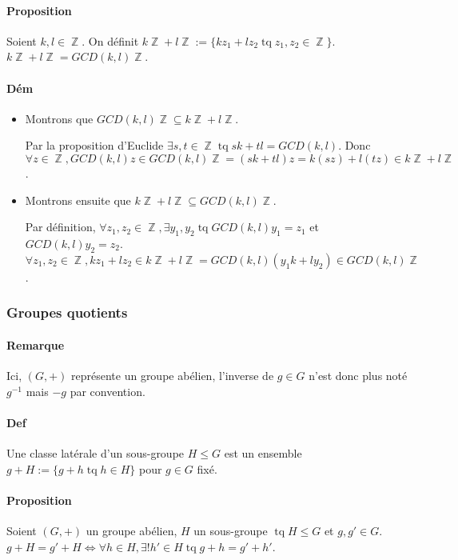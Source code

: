 \documentclass{article}
\newenvironment{lst}
	{\begin{minipage}[t]{.9\linewidth}\begin{itemize}}
	{\end{itemize}\end{minipage}}
\DeclareMathOperator{\tq}{\text{ tq }}
\DeclareMathOperator{\Z}{\mathbb Z}
\begin{document}
			\paragraph{Proposition} Soient $k, l \in \Z$. On définit $k\Z + l\Z := \{kz_1 + lz_2 \tq z_1, z_2 \in \Z\}$. $k\Z + l\Z = GCD(k, l)\Z$.

			\paragraph{Dém}
			\begin{lst}
				\item Montrons que $GCD(k, l)\Z \subseteq k\Z + l\Z$.

					  Par la proposition d'Euclide $\exists s, t \in \Z \tq sk + tl = GCD(k, l)$. Donc $\forall z \in \Z, GCD(k, l)z \in GCD(k, l)\Z =
					  (sk + tl)z = k(sz) + l(tz) \in k\Z + l\Z$.
				\item Montrons ensuite que $k\Z + l\Z \subseteq GCD(k, l)\Z$.

					  Par définition, $\forall z_1, z_2 \in \Z, \exists y_1, y_2 \tq GCD(k, l)y_1 = z_1$ et $GCD(k, l)y_2 = z_2$.
					  $\forall z_1, z_2 \in \Z, kz_1 + lz_2 \in k\Z + l\Z = GCD(k, l)(y_1k + ly_2) \in GCD(k, l)\Z$.
			\end{lst}

			\subsubsection{Groupes quotients}

			\paragraph{Remarque} Ici, $(G, +)$ représente un groupe abélien, l'inverse de $g \in G$ n'est donc plus noté $g^{-1}$ mais $-g$ par convention.

			\paragraph{Def} Une classe latérale d'un sous-groupe $H \leq G$ est un ensemble $g + H := \{g + h \tq h \in H\}$ pour $g \in G$ fixé.

			\paragraph{Proposition} Soient $(G, +)$ un groupe abélien, $H$ un sous-groupe $\tq H \leq G$ et $g, g' \in G$. $g + H = g' + H \iff
			\forall h \in H, \exists! h' \in H \tq g+h = g'+h'$.
\end{document}
